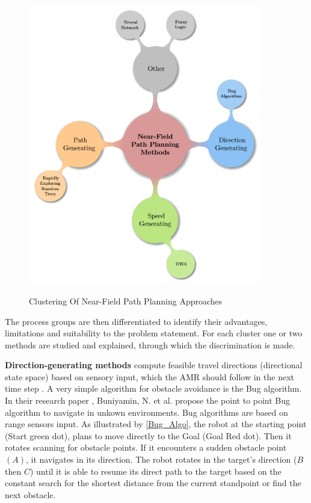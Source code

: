 \begin{figure}[H]
    \begin{center}
        \includegraphics[width=4in]{images/Chap1/clusters.png}\\
        \caption{Clustering Of Near-Field Path Planning Approaches \cite{R28}}
        \label{cluster}
        \end{center}
\end{figure}

The process groups are then differentiated to identify their advantages, limitations and suitability 
to the problem statement. For each cluster one or two methods are studied and explained, through which 
the discrimination is made. 

\textbf{Direction-generating methods} compute feasible travel directions (directional state space) 
based on sensory input, which the AMR should follow in the next time step \cite{R28}.
A very simple algorithm for obstacle avoidance is the Bug algorithm.
In their research paper \cite{R25},
Buniyamin, N. et al. propose the point to point Bug algorithm to navigate in unkown environments. 
Bug algorithms are based on range sensors input. As illustrated by \ref{Bug_Algo}, the robot at the 
starting point (Start green dot), 
plans to move directly to the 
Goal (Goal Red dot). Then it rotates scanning for obstacle points. 
If it encounters a sudden obstacle point \((A)\), it navigates in its direction.
The robot rotates in the target's direction (\(B\) then \(C\)) until it is able to resume its direct path to 
the target based on the 
constant search for the shortest distance from the current standpoint or find the next obstacle. 

